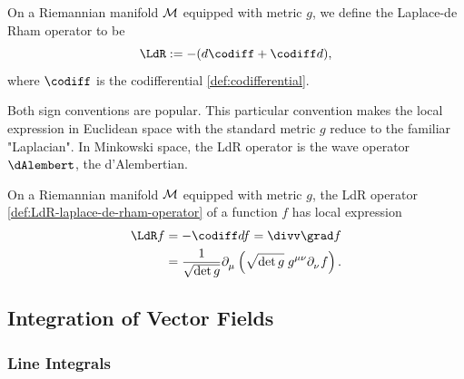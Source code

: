 \documentclass[../main.tex]{subfiles}
\begin{document}
    \begin{definition}\label{def:LdR-laplace-de-rham-operator}
        On a Riemannian manifold \(\manifold[M]\) equipped with metric \(g\), we 
        define the Laplace-de Rham operator to be 
        \[
        \LdR := -(d\codiff + \codiff d),
        \]
        where \(\codiff\) is the codifferential \cref{def:codifferential}.
    \end{definition}
    \begin{remark}
        Both sign conventions are popular. This particular convention makes the 
        local expression in Euclidean space with the standard metric \(g\) reduce 
        to the familiar "Laplacian". In Minkowski space, the LdR operator is the 
        wave operator \(\dAlembert\), the d'Alembertian.
    \end{remark}
    \begin{theorem}\label{thm:ldr-coordinates}
        On a Riemannian manifold \(\manifold[M]\) equipped with metric \(g\), the 
        LdR operator \cref{def:LdR-laplace-de-rham-operator} of a function \(f\)
        has local expression 
        \[
        \begin{aligned}
            \LdR f&=-\codiff df=\divv \grad f\\
            &=\frac{1}{\sqrt{\det g}}\tfld{\mu}\left(\sqrt{\det g}\;g^{\mu\nu}
            \tfld{\nu}f\right).
        \end{aligned}
        \]
    \end{theorem}

    \subsection{Integration of Vector Fields}
    \subsubsection{Line Integrals}
\end{document}
